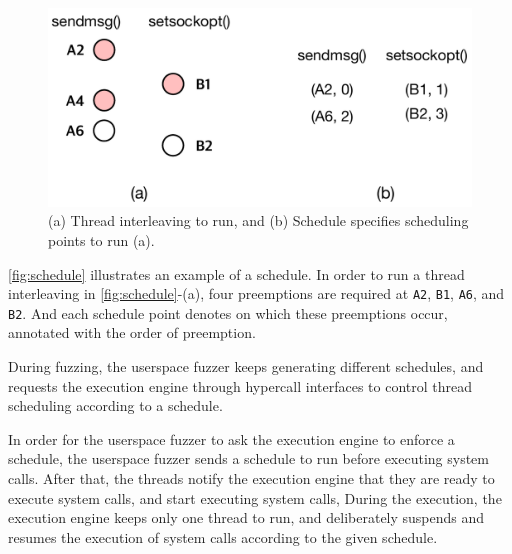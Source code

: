 \begin{figure}[t]
  \centering
  \includegraphics[width=0.9\linewidth]{fig/schedule.pdf}
  \caption{(a) Thread interleaving to run, and (b) Schedule specifies
    scheduling points to run (a).}
  \label{fig:schedule}
\end{figure}

\autoref{fig:schedule} illustrates an example of a schedule. In order
to run a thread interleaving in \autoref{fig:schedule}-(a), four
preemptions are required at \texttt{A2}, \texttt{B1}, \texttt{A6}, and
\texttt{B2}.
%
And each schedule point denotes on which these preemptions occur,
annotated with the order of preemption.


During fuzzing, the userspace fuzzer keeps generating different
schedules, and requests the execution engine through hypercall
interfaces to control thread scheduling according to a schedule.





%
In order for the userspace fuzzer to ask the execution engine to
enforce a schedule, the userspace fuzzer sends a schedule to run
before executing system calls.
%
After that, the threads notify the execution engine that they are
ready to execute system calls, and start executing system calls,
%
During the execution, the execution engine keeps only one thread to
run, and deliberately suspends and resumes the execution of system
calls according to the given schedule.


